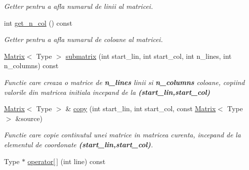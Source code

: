\begin{DoxyCompactItemize}
\begin{DoxyCompactList}\small\item\em Getter pentru a afla numarul de linii al matricei. \item\end{DoxyCompactList}\item 
\hypertarget{classMatrix_a7ee6511bb33eb5e1d070142b9428c7b5}{
int \hyperlink{classMatrix_a7ee6511bb33eb5e1d070142b9428c7b5}{get\_\-n\_\-col} () const }
\label{classMatrix_a7ee6511bb33eb5e1d070142b9428c7b5}

\begin{DoxyCompactList}\small\item\em Getter pentru a afla numarul de coloane al matricei. \item\end{DoxyCompactList}\item 
\hyperlink{classMatrix}{Matrix}$<$ Type $>$ \hyperlink{classMatrix_a0402527771ceae198c876ffb23cce1c6}{submatrix} (int start\_\-lin, int start\_\-col, int n\_\-lines, int n\_\-columns) const 
\begin{DoxyCompactList}\small\item\em Functie care creaza o matrice de {\bfseries n\_\-lines} linii si {\bfseries n\_\-columns} coloane, copiind valorile din matricea initiala incepand de la {\bfseries (start\_\-lin,start\_\-col)} \item\end{DoxyCompactList}\item 
\hyperlink{classMatrix}{Matrix}$<$ Type $>$ \& \hyperlink{classMatrix_ae186d4ba278c7c953cba1c86f016a78b}{copy} (int start\_\-lin, int start\_\-col, const \hyperlink{classMatrix}{Matrix}$<$ Type $>$ \&source)
\begin{DoxyCompactList}\small\item\em Functie care copie continutul unei matrice in matricea curenta, incepand de la elementul de coordonate {\bfseries (start\_\-lin,start\_\-col)}. \item\end{DoxyCompactList}\item 
\hypertarget{classMatrix_aee246cf6d811890281f4189277e48fae}{
Type $\ast$ \hyperlink{classMatrix_aee246cf6d811890281f4189277e48fae}{operator\mbox{[}$\,$\mbox{]}} (int line) const }
\label{classMatrix_aee246cf6d811890281f4189277e48fae}


\end{DoxyCompactItemize}
